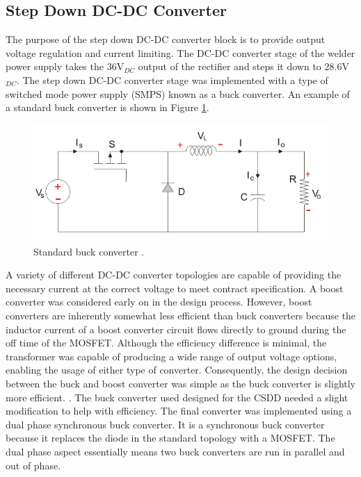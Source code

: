 \documentclass[11pt]{article}
\begin{document}
        
    \subsection{Step Down DC-DC Converter}
    The purpose of the step down DC-DC converter block is to provide output voltage regulation and current limiting. The DC-DC converter stage of the welder power supply takes the 36V$_{DC}$ output of the rectifier and steps it down to 28.6V$_{DC}$. The step down DC-DC converter stage was implemented with a type of switched mode power supply (SMPS) known as a buck converter. An example of a standard buck converter is shown in Figure \ref{buck}.
    
    \begin{figure}[H]
            \centering
            \includegraphics[width=0.6\linewidth]{1529672077.png}
            \caption{Standard buck converter \cite{electrics4u_group_standard_2019}.}
            \label{buck}
        \end{figure}
    
    \noindent A variety of different DC-DC converter topologies are capable of providing the necessary current at the correct voltage to meet contract specification. A boost converter was considered early on in the design process. However, boost converters are inherently somewhat less efficient than buck converters because the inductor current of a boost converter circuit flows directly to ground during the off time of the MOSFET. Although the efficiency difference is minimal, the transformer was capable of producing a wide range of output voltage options, enabling the usage of either type of converter. Consequently, the design decision between the buck and boost converter was simple as the buck converter is slightly more efficient. \cite{eric_coates_module_2018}.
    \newline
    \newline
   \noindent The buck converter used designed for the CSDD needed a slight modification to help with efficiency. The final converter was implemented using a dual phase synchronous buck converter. It is a synchronous buck converter because it replaces the diode in the standard topology with a MOSFET. The dual phase aspect essentially means two buck converters are run in parallel and out of phase. 
    
\end{document}
